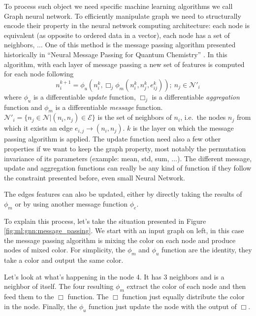 \documentclass[../main.tex]{subfiles}
\begin{document}
To process such object we need specific machine learning algorithms we call Graph neural network.
To efficiently manipulate graph we need to structurally encode their property in the neural network computing architecture: each node is equivalent (as opposite to ordered data in a vector), each node has a set of neighbors, $\ldots$ One of this method is the message passing algorithm presented historically in ``Neural Message Passing for Quantum Chemistry'' \cite{gilmer_neural_2017}. In this algorithm, with each layer of message passing a new set of features is computed for each node following
\begin{equation}
  n_i^{k+1} = \phi_u (n_i^k, \Box_j \phi_m(n_i^k, n_j^k, e^k_{ij})); ~ n_j \in \mathcal{N}'_i
\end{equation}
where $\phi_u$ is a differentiable \textit{update} function, $\Box_j$ is a differentiable \textit{aggregation} function and $\phi_m$ is a differentiable \textit{message} function. $\mathcal{N}'_i = \{n_j \in \mathcal{N} | (n_i, n_j) \in \mathcal{E}\}$ is the set of neighbors of $n_i$, i.e.\ the nodes $n_j$ from which it exists an edge $e_{i,j} \rightarrow (n_i, n_j)$. $k$ is the layer on which the message passing algorithm is applied. The update function need also a few other properties if we want to keep the graph property, most notably the permutation invariance of its parameters (example: mean, std, sum, $\ldots$). The different message, update and aggregation functions can really be any kind of function if they follow the constraint presented before, even small Neural Network.

The edges features can also be updated, either by directly taking the results of $\phi_m$ or by using another message function $\phi_e$.

To explain this process, let's take the situation presented in Figure \ref{fig:ml:gnn:message_passing}. We start with an input graph on left, in this case the message passing algorithm is mixing the color on each node and produce nodes of mixed color. For simplicity, the $\phi_m$ and $\phi_u$ function are the identity, they take a color and output the same color.

Let's look at what's happening in the node 4. It has 3 neighbors and is a neighbor of itself. The four resulting $\phi_m$ extract the color of each node and then feed them to the $\Box$ function. The $\Box$ function just equally distribute the color in the node. Finally, the $\phi_u$ function just update the node with the output of $\Box$.
\end{document}
